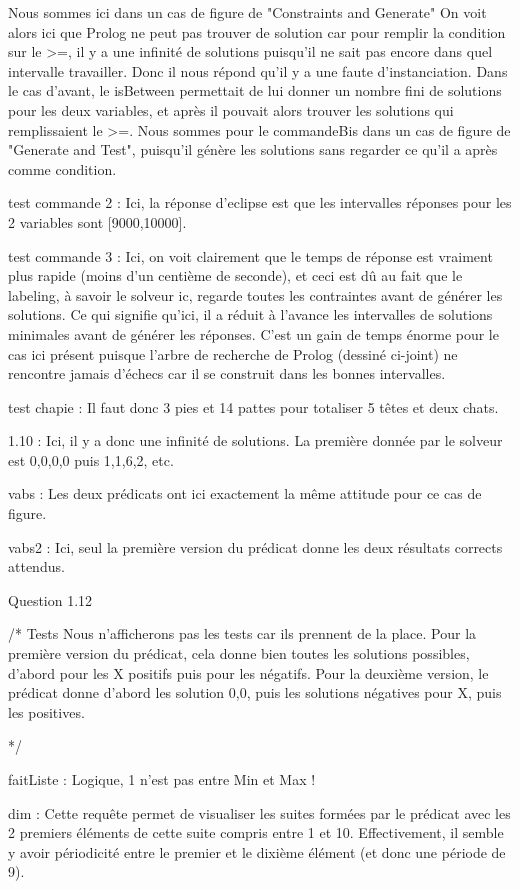 \documentclass[11pt]{article} %
\begin{document}
Nous sommes ici dans un cas de figure de "Constraints and Generate"
On voit alors ici que Prolog ne peut pas trouver de solution car pour remplir la condition
sur le >=, il y a une infinité de solutions puisqu'il ne sait pas encore dans quel intervalle travailler.
Donc il nous répond qu'il y a une faute d'instanciation.
Dans le cas d'avant, le isBetween permettait de lui donner un nombre fini de solutions pour les deux variables,
et après il pouvait alors trouver les solutions qui remplissaient le >=.
Nous sommes pour le commandeBis dans un cas de figure de "Generate and Test", puisqu'il génère les solutions sans
regarder ce qu'il a après comme condition.

test commande 2 :
Ici, la réponse d'eclipse est que les intervalles réponses pour les 2 variables sont
[9000,10000].

test commande 3 :
Ici, on voit clairement que le temps de réponse est vraiment plus rapide (moins d'un centième de seconde),
et ceci est dû au fait que le labeling, à savoir le solveur ic, regarde toutes les contraintes avant de
générer les solutions. Ce qui signifie qu'ici, il a réduit à l'avance les intervalles de solutions minimales
avant de générer les réponses. C'est un gain de temps énorme pour le cas ici présent puisque l'arbre de recherche
de Prolog (dessiné ci-joint) ne rencontre jamais d'échecs car il se construit dans les bonnes intervalles.

test chapie : 
Il faut donc 3 pies et 14 pattes pour totaliser 5 têtes et deux chats.

1.10 : 
Ici, il y a donc une infinité de solutions. La première donnée par le solveur est
{0,0,0,0} puis {1,1,6,2}, etc.

vabs : 
Les deux prédicats ont ici exactement la même attitude pour ce cas de figure.

vabs2 : 
Ici, seul la première version du prédicat donne les deux résultats corrects attendus.

 Question 1.12

/* Tests
Nous n'afficherons pas les tests car ils prennent de la place.
Pour la première version du prédicat, cela donne bien toutes les solutions possibles,
d'abord pour les X positifs puis pour les négatifs.
Pour la deuxième version, le prédicat donne d'abord les solution {0,0}, puis les solutions
négatives pour X, puis les positives.

*/

faitListe : 
Logique, 1 n'est pas entre Min et Max !

dim : 
Cette requête permet de visualiser les suites formées par le prédicat avec les 2 premiers
éléments de cette suite compris entre 1 et 10. Effectivement, il semble y avoir périodicité entre le premier
et le dixième élément (et donc une période de 9).
\end{document}
